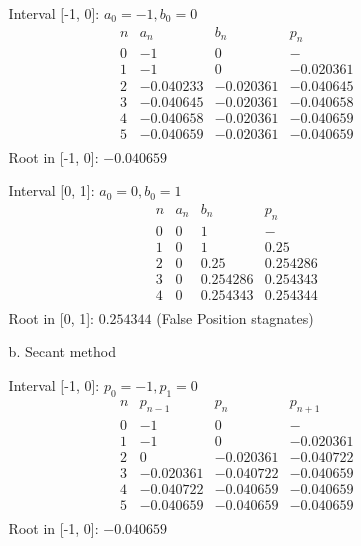 \begin{enumerate}
\begin{enumerate}
        Interval [-1, 0]: \( a_0 = -1, b_0 = 0 \)
        \[
          \begin{array}{l|lll}
            n & a_n & b_n & p_n \\
            \hline
            0 & -1 & 0 & - \\
            1 & -1 & 0 & -0.020361 \\
            2 & -0.040233 & -0.020361 & -0.040645 \\
            3 & -0.040645 & -0.020361 & -0.040658 \\
            4 & -0.040658 & -0.020361 & -0.040659 \\
            5 & -0.040659 & -0.020361 & -0.040659 \\
          \end{array}
        \]
        Root in [-1, 0]: \( \boxed{-0.040659} \)

        Interval [0, 1]: \( a_0 = 0, b_0 = 1 \)
        \[
          \begin{array}{l|lll}
            n & a_n & b_n & p_n \\
            \hline
            0 & 0 & 1 & - \\
            1 & 0 & 1 & 0.25 \\
            2 & 0 & 0.25 & 0.254286 \\
            3 & 0 & 0.254286 & 0.254343 \\
            4 & 0 & 0.254343 & 0.254344 \\
          \end{array}
        \]
        Root in [0, 1]: \( \boxed{0.254344} \) (False Position stagnates)


      \item[b.] Secant method

        Interval [-1, 0]: \( p_0 = -1, p_1 = 0 \)
        \[
          \begin{array}{l|lll}
            n & p_{n-1} & p_n & p_{n+1} \\
            \hline
            0 & -1 & 0 & - \\
            1 & -1 & 0 & -0.020361 \\
            2 & 0 & -0.020361 & -0.040722 \\
            3 & -0.020361 & -0.040722 & -0.040659 \\
            4 & -0.040722 & -0.040659 & -0.040659 \\
            5 & -0.040659 & -0.040659 & -0.040659 \\
          \end{array}
        \]
        Root in [-1, 0]: \( \boxed{-0.040659} \)


\end{enumerate}
\end{enumerate}
